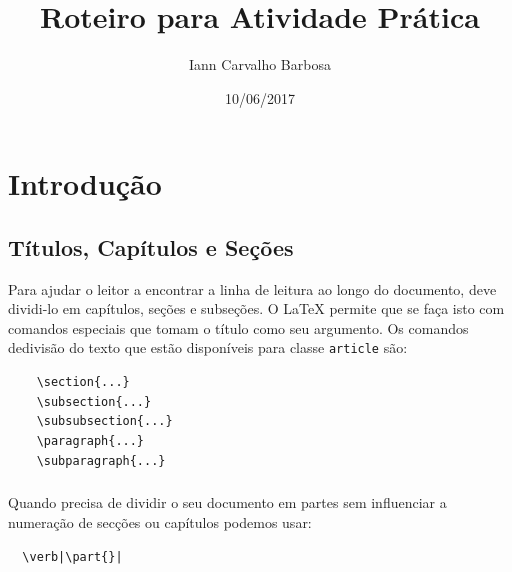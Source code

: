 \documentclass[a4paper,10pt]{report}
\title{Roteiro para Atividade Prática}
\author{Iann Carvalho Barbosa}
\date{10/06/2017}
\begin{document}
\maketitle

\tableofcontents
\newpage

\listoffigures
\newpage

\listoftables
\newpage

\chapter{Introdução}
\section{Títulos, Capítulos e Seções}


Para ajudar o leitor a encontrar a linha de leitura ao longo do documento, deve dividi-lo em capítulos, seções e subseções. O \LaTeX{} permite que se faça isto com comandos especiais que tomam o título como seu argumento. Os comandos dedivisão do texto que estão disponíveis para classe \verb|article| são:
    \begin{verbatim}
    \section{...}
    \subsection{...}
    \subsubsection{...}
    \paragraph{...}
    \subparagraph{...}
    \end{verbatim}

  \paragraph{}
Quando  precisa  de  dividir  o  seu  documento  em  partes  sem  influenciar a numeração de secções ou capítulos podemos usar:
\begin{verbatim}
  \verb|\part{}|
\end{verbatim}
\end{document}
